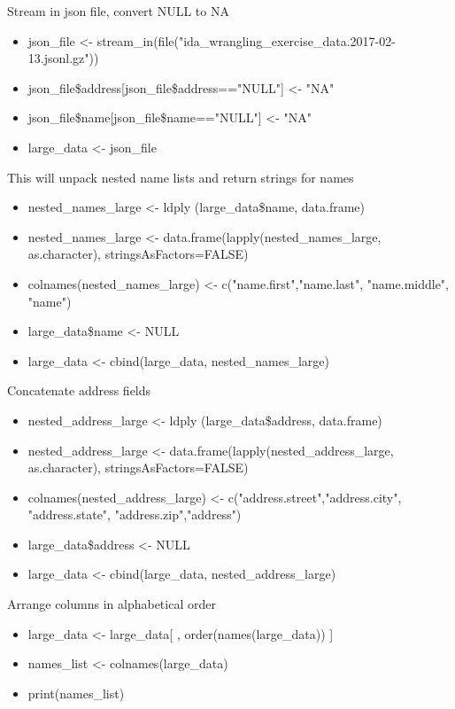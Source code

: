 \documentclass[12pt,fleqn]{report} %
\begin{document}
\begin{remark}
	Stream in json file, convert NULL to NA   
    \begin{itemize}
    	\item json\_file <- stream\_in(file("ida\_wrangling\_exercise\_data.2017-02-13.jsonl.gz"))
    	\item json\_file\$address[json\_file\$address=="NULL"] <- "NA"
    	\item json\_file\$name[json\_file\$name=="NULL"] <- "NA"
    	\item large\_data <- json\_file
    \end{itemize}
\end{remark}

\begin{remark}
This will unpack nested name lists and return strings for names 
    \begin{itemize}
    	\item nested\_names\_large <- ldply (large\_data\$name, data.frame)
    	\item nested\_names\_large <- data.frame(lapply(nested\_names\_large, as.character), stringsAsFactors=FALSE)
    	\item colnames(nested\_names\_large) <- c("name.first","name.last", "name.middle", "name")
    	\item large\_data\$name <- NULL
    	\item large\_data <- cbind(large\_data, nested\_names\_large)
    \end{itemize}
\end{remark}

\begin{remark}
Concatenate address fields 
    \begin{itemize}
    	\item nested\_address\_large <- ldply (large\_data\$address, data.frame)
    	\item nested\_address\_large <- data.frame(lapply(nested\_address\_large, as.character), stringsAsFactors=FALSE)
    	\item colnames(nested\_address\_large) <- c("address.street","address.city", "address.state", "address.zip","address")
    	\item large\_data\$address <- NULL
    	\item large\_data <- cbind(large\_data, nested\_address\_large)
    \end{itemize}
\end{remark}


\begin{remark}
Arrange columns in alphabetical order
    \begin{itemize}
    	\item large\_data <- large\_data[ , order(names(large\_data)) ]
    	\item names\_list <- colnames(large\_data)
    	\item print(names\_list)
    \end{itemize}
\end{remark}
\end{document}
